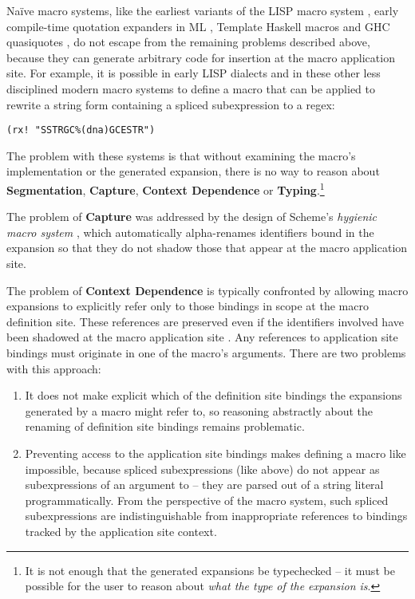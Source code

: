 {{Na\"ive macro systems, like the earliest variants of the LISP macro system \cite{Hart63a}, early compile-time quotation expanders in ML \cite{mauny1994complete}, Template Haskell macros \cite{SheardPeytonJones:Haskell-02} and GHC quasiquotes \cite{mainland2007s}, do not escape from the remaining problems described above, because they can generate arbitrary code for insertion at the macro application site. For example, it is possible in early LISP dialects and in these other less disciplined modern macro systems to define a macro  that can be applied to rewrite a string form containing a spliced subexpression to a regex:
\begin{lstlisting}[numbers=none]
(rx! "SSTRGC%(dna)GCESTR")
\end{lstlisting}
The problem with these systems is that without examining the macro's implementation or the generated expansion, there is no way to reason about \textbf{Segmentation}, \textbf{Capture}, \textbf{Context Dependence} or \textbf{Typing}.\footnote{It is not enough that the generated expansions be typechecked -- it must be possible for the user to reason about \emph{what the type of the expansion is}.}

The problem of \textbf{Capture} was addressed by the design of Scheme's \emph{hygienic macro system} \cite{Kohlbecker86a,DBLP:conf/popl/Adams15,Herman10:Theory,DBLP:conf/esop/HermanW08,DBLP:journals/lisp/DybvigHB92,DBLP:conf/popl/ClingerR91}, which automatically alpha-renames identifiers bound in the expansion so that they do not shadow those that appear at the macro application site. %

The problem of \textbf{Context Dependence} is typically confronted by allowing macro expansions to explicitly refer only to those bindings in scope at the macro definition site. These references are preserved even if the identifiers involved have been shadowed at the macro application site \cite{DBLP:conf/popl/ClingerR91,DBLP:journals/lisp/DybvigHB92,DBLP:conf/popl/Adams15}. Any references to application site bindings must originate in one of the macro's arguments. There are two problems with this approach:
\begin{enumerate}
\item It does not make explicit which of the definition site bindings the expansions generated by a macro might refer to, so reasoning abstractly about the renaming of definition site bindings remains problematic.
\item Preventing access to the application site bindings makes defining a macro like  impossible, because spliced subexpressions (like  above) do not appear as subexpressions of an argument to  -- they are parsed out of a string literal programmatically. From the perspective of the macro system, such spliced subexpressions are indistinguishable from inappropriate references to bindings tracked by the application site context. 


\end{enumerate}}}

